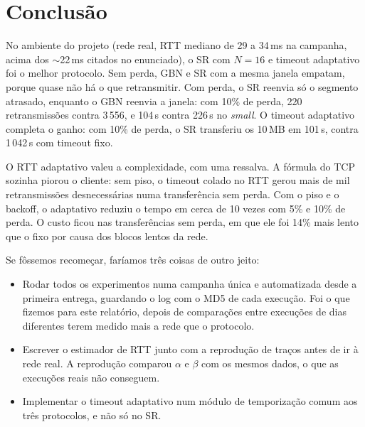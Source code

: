 \documentclass[11pt,a4paper]{article}
\begin{document}
\section{Conclusão}

No ambiente do projeto (rede real, RTT mediano de 29 a 34\,ms na campanha,
acima dos $\sim$22\,ms citados no enunciado), o SR com
$N=16$ e timeout adaptativo foi o melhor protocolo. Sem perda, GBN e SR com a
mesma janela empatam, porque quase não há o que retransmitir. Com perda, o SR
reenvia só o segmento atrasado, enquanto o GBN reenvia a janela: com 10\% de
perda, 220 retransmissões contra 3\,556, e 104\,s contra 226\,s no
\emph{small}. O timeout adaptativo completa o ganho: com 10\% de perda, o
SR transferiu os 10\,MB em 101\,s, contra 1\,042\,s com timeout fixo.

O RTT adaptativo valeu a complexidade, com uma ressalva. A fórmula do TCP
sozinha piorou o cliente: sem piso, o timeout colado no RTT gerou mais de mil
retransmissões desnecessárias numa transferência sem perda. Com o piso e o
backoff, o adaptativo reduziu o tempo em cerca de 10 vezes com 5\% e 10\% de
perda. O custo ficou nas transferências sem perda, em que ele foi 14\% mais
lento que o fixo por causa dos blocos lentos da rede.

Se fôssemos recomeçar, faríamos três coisas de outro jeito:
\begin{itemize}[nosep]
  \item Rodar todos os experimentos numa campanha única e automatizada desde a
    primeira entrega, guardando o log com o MD5 de cada execução. Foi o que
    fizemos para este relatório, depois de comparações entre execuções de dias
    diferentes terem medido mais a rede que o protocolo.
  \item Escrever o estimador de RTT junto com a reprodução de traços antes de
    ir à rede real. A reprodução comparou $\alpha$ e $\beta$ com os mesmos
    dados, o que as execuções reais não conseguem.
  \item Implementar o timeout adaptativo num módulo de temporização comum aos
    três protocolos, e não só no SR.
\end{itemize}

\end{document}
